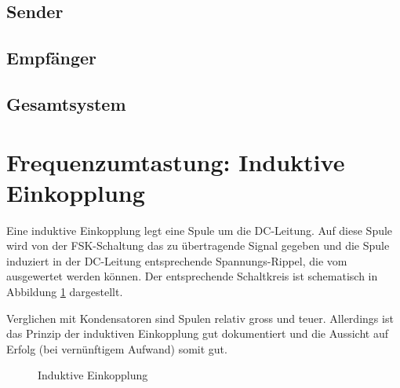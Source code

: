\subsection{Sender}
\label{sec:simu:fsk:capacitive:transmitter}

\subsection{Empf\"anger}
\label{sec:simu:fsk:capacitive:receiver}

\subsection{Gesamtsystem}
\label{sec:simu:fsk:capacitive:system}

\section{Frequenzumtastung: Induktive Einkopplung}
\label{sec:simu:fsk:inductive}

Eine induktive Einkopplung legt eine  Spule um die DC-Leitung. Auf diese Spule
wird von der FSK-Schaltung das zu  \"ubertragende Signal gegeben und die Spule
induziert in  der DC-Leitung  entsprechende Spannungs-Rippel, die  vom \Master
ausgewertet werden k\"onnen. Der entsprechende  Schaltkreis ist schematisch in
Abbildung \ref{fig:circ:coupling:inductive} dargestellt.

Verglichen mit  Kondensatoren sind Spulen relativ  gross und teuer. Allerdings
ist das Prinzip  der induktiven Einkopplung gut dokumentiert  und die Aussicht
auf Erfolg (bei vern\"unftigem Aufwand) somit gut.

\begin{figure}[h!tb]
    \centering
    
    \caption{Induktive Einkopplung}
    \label{fig:circ:coupling:inductive}
\end{figure}

